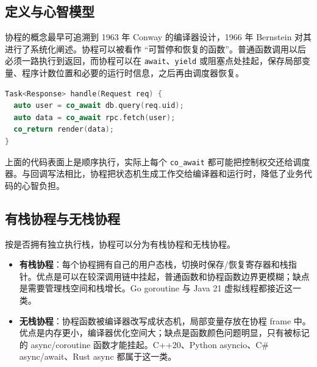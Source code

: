 \documentclass[UTF8,a4paper,12pt]{ctexart}
\begin{document}
\subsection{定义与心智模型}

协程的概念最早可追溯到 1963 年 Conway 的编译器设计\cite{conway1963design}，1966 年 Bernstein 对其进行了系统化阐述\cite{bernstein1966coroutines}。协程可以被看作 ``可暂停和恢复的函数''。普通函数调用以后必须一路执行到返回，而协程可以在 \verb|await|、\verb|yield| 或阻塞点处挂起，保存局部变量、程序计数位置和必要的运行时信息，之后再由调度器恢复。

\begin{lstlisting}[language=C++,caption={C++20 风格的协程伪代码}]
Task<Response> handle(Request req) {
  auto user = co_await db.query(req.uid);
  auto data = co_await rpc.fetch(user);
  co_return render(data);
}
\end{lstlisting}

上面的代码表面上是顺序执行，实际上每个 \verb|co_await| 都可能把控制权交还给调度器。与回调写法相比，协程把状态机生成工作交给编译器和运行时，降低了业务代码的心智负担。

\subsection{有栈协程与无栈协程}

按是否拥有独立执行栈，协程可以分为有栈协程和无栈协程\cite{moura2009revisiting}。

\begin{itemize}
  \item \textbf{有栈协程}：每个协程拥有自己的用户态栈，切换时保存/恢复寄存器和栈指针。优点是可以在较深调用链中挂起，普通函数和协程函数边界更模糊；缺点是需要管理栈空间和栈增长。Go goroutine 与 Java 21 虚拟线程都接近这一类。
  \item \textbf{无栈协程}：协程函数被编译器改写成状态机，局部变量存放在协程 frame 中。优点是内存更小，编译器优化空间大；缺点是函数颜色问题明显，只有被标记的 async/coroutine 函数才能挂起。C++20、Python asyncio、C\# async/await、Rust async 都属于这一类。
\end{itemize}
\end{document}

